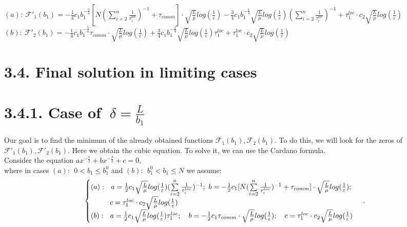 \documentclass{article}
\theoremstyle{definition}
\theoremstyle{plain}
\begin{document}
$(a): ~\mathcal{F'}_1(b_1) = -\frac{1}{4}c_1 b_1^{-\frac{5}{4}}  [N (\sum\limits_{i = 2}^{n} \frac{1}{\tau_i^{loc}})^{-1} + \tau_{comm}]\cdot 
\sqrt{\frac{L}{\mu}}log (\frac{1}{\varepsilon})  - 
\frac{3}{4} c_1 b_1^{-\frac{1}{4}}   \sqrt{\frac{L}{\mu}}log (\frac{1}{\varepsilon})(\sum\limits_{i = 2}^{n} \frac{1}{\tau_i^{loc}})^{-1} +
\tau_1^{loc}\cdot c_2  \sqrt{\frac{L}{\mu}}log (\frac{1}{\varepsilon})$ \\
$(b): ~\mathcal{F'}_2(b_1) = -\frac{1}{4}c_1 b_1^{-\frac{5}{4}} \tau_{comm}\cdot \sqrt{\frac{L}{\mu}}log (\frac{1}{\varepsilon}) + \frac{3}{4} c_1 b_1^{-\frac{1}{4}}  \sqrt{\frac{L}{\mu}}log (\frac{1}{\varepsilon})\tau_1^{loc}   + \tau_1^{loc}\cdot c_2  \sqrt{\frac{L}{\mu}}log (\frac{1}{\varepsilon})$\\

\section*{3.4. Final solution in limiting cases}
\section*{3.4.1. Case of $~\delta = \frac{L}{b_1}$}\label{eq:3.4.1}
Our goal is to find the minimum of the already obtained functions $\mathcal{F}_1(b_1), \mathcal{F}_2(b_1)$. To do this, we will look for the zeros of $\mathcal{F'}_1(b_1), \mathcal{F'}_2(b_1)$. Here we obtain the cubic equation.
To solve it, we can use the Cardano formula.\\
Consider the equation $ax^{-\frac{1}{2}} + bx^{-\frac{3}{2}} + c = 0$,\\
where in cases $(a): ~ ~ 0 < b_1 \leq b_1^0 $ and $(b): ~ ~ b_1^0 <  b_1 \leq N$ we assume:
\begin{eqnarray}
\notag
    \begin{cases}
    (a): ~ ~ a = \frac{1}{2} c_1 \sqrt{\frac{L}{\mu}}log (\frac{1}{\varepsilon})(\sum\limits_{i = 2}^{n} \frac{1}{\tau_i^{loc}})^{-1}; ~
b = -\frac{1}{2} c_1 [N (\sum\limits_{i = 2}^{n} \frac{1}{\tau_i^{loc}})^{-1} + \tau_{comm}]\cdot 
\sqrt{\frac{L}{\mu}}log (\frac{1}{\varepsilon});\\
\quad\quad~~ c = \tau_1^{loc}\cdot c_2  \sqrt{\frac{L}{\mu}}log (\frac{1} {\varepsilon})
    \\
\notag
    (b): ~ ~ a = \frac{1}{2} c_1  \sqrt{\frac{L}{\mu}}log (\frac{1}{\varepsilon})\tau_1^{loc}; \quad 
b = -\frac{1}{2}c_1 \tau_{comm}\cdot \sqrt{\frac{L}{\mu}}log (\frac{1}{\varepsilon}); \quad 
c = \tau_1^{loc}\cdot c_2  \sqrt{\frac{L}{\mu}}log (\frac{1} {\varepsilon})
    \end{cases}\,.
\end{eqnarray}
\end{document}

